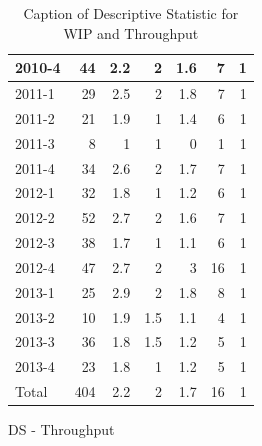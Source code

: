 \documentclass[UKenglish]{ifimaster}  %
\begin{document}
\begin{appendices}
\begin{table}[!htbp]
\begin{adjustwidth}{-1.5cm}{}
\begin{subfigure}[b]{0.3\textwidth}
{\begin{tabular}{ | l | r | r | r | r | r | r | }
 2010-4  & 44 & 2.2 & 2 & 1.6 & 7 & 1 \\ \hline
 2011-1  & 29 & 2.5 & 2 & 1.8 & 7 & 1 \\ \hline
 2011-2  & 21 & 1.9 & 1 & 1.4 & 6 & 1 \\ \hline
 2011-3  & 8 & 1 & 1 & 0 &1 & 1 \\ \hline
 2011-4  & 34 & 2.6 & 2 & 1.7 & 7 & 1 \\ \hline
 2012-1  & 32 & 1.8 & 1 & 1.2 & 6 & 1 \\ \hline
 2012-2  & 52 & 2.7 & 2 & 1.6 & 7 & 1 \\ \hline
 2012-3  & 38 & 1.7 & 1 & 1.1 & 6 & 1 \\ \hline
 2012-4  & 47 & 2.7 & 2 & 3 & 16 & 1 \\ \hline
 2013-1  & 25 & 2.9 & 2 & 1.8 & 8 & 1 \\ \hline
 2013-2  & 10 & 1.9 & 1.5 & 1.1 & 4 & 1 \\ \hline
 2013-3  & 36 & 1.8 & 1.5 & 1.2 & 5 & 1 \\ \hline
 2013-4  & 23 & 1.8 & 1 & 1.2 & 5 & 1 \\ \hline
 Total  & 404 & 2.2 & 2 & 1.7 & 16 & 1 \\ \hline
\end{tabular}
}
\caption{DS - Throughput}
 \label{DS:Throughput:10}
\end{subfigure}
\end{adjustwidth}
\caption[Optional caption for list of figures]{Caption of Descriptive Statistic for WIP and Throughput}
\label{DS:10:1}
\end{table}


\end{appendices}
\end{document}
